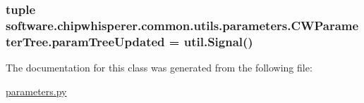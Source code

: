 \hypertarget{classsoftware_1_1chipwhisperer_1_1common_1_1utils_1_1parameters_1_1CWParameterTree_a6a2bd5aafdc0cfe0755ff5abeb7edb71}{}
\subsubsection[{param\+Tree\+Updated}]{\setlength{\rightskip}{0pt plus 5cm}tuple software.\+chipwhisperer.\+common.\+utils.\+parameters.\+C\+W\+Parameter\+Tree.\+param\+Tree\+Updated = {\bf util.\+Signal}()\hspace{0.3cm}{\ttfamily [static]}}\label{classsoftware_1_1chipwhisperer_1_1common_1_1utils_1_1parameters_1_1CWParameterTree_a6a2bd5aafdc0cfe0755ff5abeb7edb71}


The documentation for this class was generated from the following file\+:\begin{DoxyCompactItemize}
\item 
\hyperlink{parameters_8py}{parameters.\+py}\end{DoxyCompactItemize}
